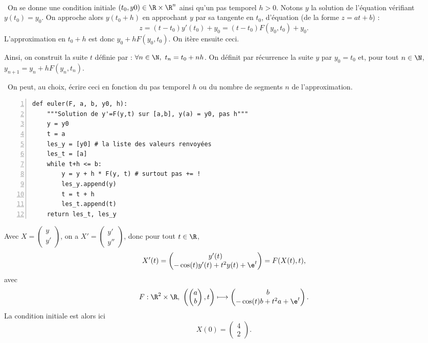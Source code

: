 \exer{[EQD-000]}
\setcounter{numques}{0}~\\

\question\ On se donne une condition initiale $(t_0,y0) \in \R\times \R^n$ ainsi qu'un pas temporel $h>0$. Notons $y$ la solution de l'équation vérifiant $y(t_0) = y_0$. 
On approche alors $y(t_0+h)$ en approchant $y$ par sa tangente en $t_0$, d'équation (de la forme $z = at+b$) : 
\begin{equation*}
  z = (t-t_0)y'(t_0) + y_0 = (t-t_0)F(y_0,t_0)  + y_0. 
\end{equation*}
L'approximation en $t_0+h$ est donc $y_0 + hF(y_0,t_0)$. On itère ensuite ceci. 

Ainsi, on construit la suite $t$ définie par : $\forall n \in \N,~ t_n = t_0 + nh$. On définit par récurrence la suite $y$ par $y_0 = t_0$ et, pour tout $n\in \N$, $y_{n+1} = y_n + h F(y_n,t_n)$. 

\question\ On peut, au choix, écrire ceci en fonction du pas temporel $h$ ou du nombre de segments $n$ de l'approximation. 

\begin{Verbatim}[gobble=0,numbers=left]
def euler(F, a, b, y0, h):
    """Solution de y'=F(y,t) sur [a,b], y(a) = y0, pas h"""
    y = y0
    t = a
    les_y = [y0] # la liste des valeurs renvoyées
    les_t = [a]
    while t+h <= b:
        y = y + h * F(y, t) # surtout pas += !
        les_y.append(y)
        t = t + h
        les_t.append(t)
    return les_t, les_y
\end{Verbatim}

\question Avec $X = \begin{pmatrix} y \\ y' \end{pmatrix}$, on a $X' = \begin{pmatrix} y' \\ y'' \end{pmatrix}$, donc pour tout $t\in \R$,
\begin{equation*}
  X'(t) = \begin{pmatrix} y'(t) \\-\cos(t)y'(t) + t^2y(t) + \e^t  \end{pmatrix} = F(X(t),t),
\end{equation*}
avec 
\begin{equation*}
  F : \R^2 \times \R,~ \left( \begin{pmatrix} a \\ b \end{pmatrix} , t \right) \longmapsto  \begin{pmatrix} b \\-\cos(t)b + t^2a + \e^t  \end{pmatrix}.
\end{equation*}
La condition initiale est alors ici 
\begin{equation*}
  X(0) = \begin{pmatrix} 4 \\ 2 \end{pmatrix}.
\end{equation*}

